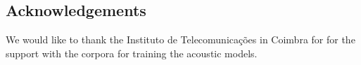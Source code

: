 \documentclass[twocolumn]{bmcart}%
\begin{document}
\begin{backmatter}

\section{Acknowledgements}
  We would like to thank the Instituto de Telecomunica\c{c}\~oes in Coimbra for
  for the support with the corpora for training the acoustic models.












\end{backmatter}
\end{document}

